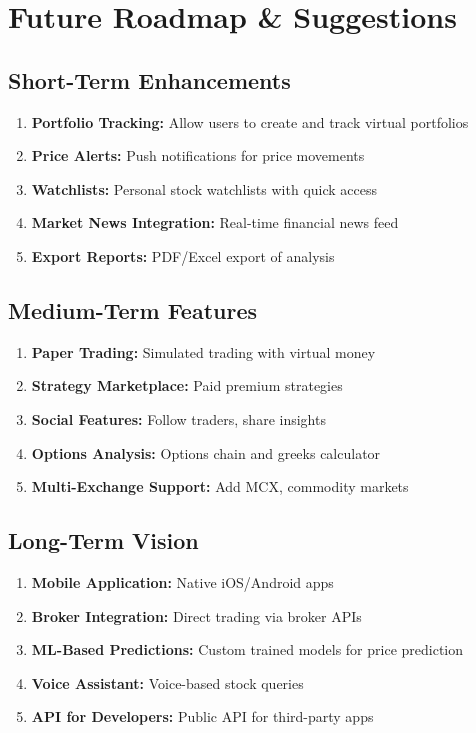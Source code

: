 \documentclass[11pt,a4paper]{article}
\begin{document}
\section{Future Roadmap \& Suggestions}

\subsection{Short-Term Enhancements}

\begin{enumerate}[leftmargin=*]
    \item \textbf{Portfolio Tracking:} Allow users to create and track virtual portfolios
    \item \textbf{Price Alerts:} Push notifications for price movements
    \item \textbf{Watchlists:} Personal stock watchlists with quick access
    \item \textbf{Market News Integration:} Real-time financial news feed
    \item \textbf{Export Reports:} PDF/Excel export of analysis
\end{enumerate}

\subsection{Medium-Term Features}

\begin{enumerate}[leftmargin=*]
    \item \textbf{Paper Trading:} Simulated trading with virtual money
    \item \textbf{Strategy Marketplace:} Paid premium strategies
    \item \textbf{Social Features:} Follow traders, share insights
    \item \textbf{Options Analysis:} Options chain and greeks calculator
    \item \textbf{Multi-Exchange Support:} Add MCX, commodity markets
\end{enumerate}

\subsection{Long-Term Vision}

\begin{enumerate}[leftmargin=*]
    \item \textbf{Mobile Application:} Native iOS/Android apps
    \item \textbf{Broker Integration:} Direct trading via broker APIs
    \item \textbf{ML-Based Predictions:} Custom trained models for price prediction
    \item \textbf{Voice Assistant:} Voice-based stock queries
    \item \textbf{API for Developers:} Public API for third-party apps
\end{enumerate}
\end{document}
